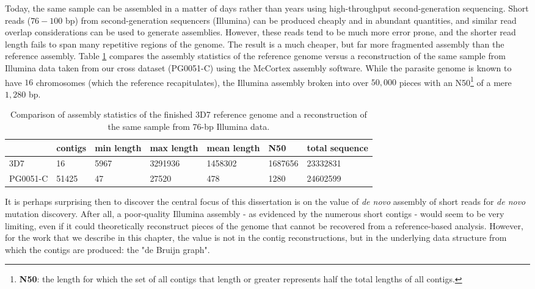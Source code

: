 Today, the same sample can be assembled in a matter of days rather than years using high-throughput second-generation sequencing.  Short reads ($76-100$ bp) from second-generation sequencers (Illumina) can be produced cheaply and in abundant quantities, and similar read overlap considerations can be used to generate assemblies.  However, these reads tend to be much more error prone, and the shorter read length fails to span many repetitive regions of the genome.  The result is a much cheaper, but far more fragmented assembly than the reference assembly.  Table \ref{tbl:asmcompare} compares the assembly statistics of the reference genome versus a reconstruction of the same sample from Illumina data taken from our cross dataset (PG0051-C) using the McCortex assembly software\cite{Turner:2015ve}.  While the parasite genome is known to have $16$ chromosomes (which the reference recapitulates), the Illumina assembly broken into over $50,000$ pieces with an N50\footnote{\textbf{N50}: the length for which the set of all contigs that length or greater represents half the total lengths of all contigs.} of a mere $1,280$ bp.

\begin{table}[]
\centering
\caption{Comparison of assembly statistics of the finished 3D7 reference genome and a reconstruction of the same sample from $76$-bp Illumina data.}
\label{tbl:asmcompare}
\begin{tabular}{@{}lllllll@{}}
\toprule
          & contigs & min length & max length & mean length & N50     & total sequence \\ \midrule
3D7       & 16      & 5967       & 3291936    & 1458302     & 1687656 & 23332831       \\
PG0051-C  & 51425   & 47         & 27520      & 478         & 1280    & 24602599       \\ \bottomrule
\end{tabular}
\end{table}

It is perhaps surprising then to discover the central focus of this dissertation is on the value of \textit{de novo} assembly of short reads for \textit{de novo} mutation discovery.  After all, a poor-quality Illumina assembly - as evidenced by the numerous short contigs - would seem to be very limiting, even if it could theoretically reconstruct pieces of the genome that cannot be recovered from a reference-based analysis.  However, for the work that we describe in this chapter, the value is not in the contig reconstructions, but in the underlying data structure from which the contigs are produced: the "de Bruijn graph".

